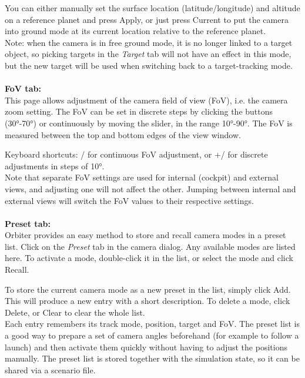 \documentclass[Orbiter User Manual.tex]{subfiles}
\begin{document}
\noindent
You can either manually set the surface location (latitude/longitude) and altitude on a reference planet and press Apply, or just press Current to put the camera into ground mode at its current location relative to the reference planet.\\
Note: when the camera is in free ground mode, it is no longer linked to a target object, so picking targets in the \textit{Target} tab will not have an effect in this mode, but the new target will be used when switching back to a target-tracking mode.\\
\\
\textbf{FoV tab:}\\
This page allows adjustment of the camera field of view (FoV), i.e. the camera zoom setting. The FoV can be set in discrete steps by clicking the buttons (30°-70°) or continuously by moving the slider, in the range 10°-90°. The FoV is measured between the top and bottom edges of the view window.

\begin{figure}[H]
	\centering
\end{figure}

\noindent
Keyboard shortcuts: / for continuous FoV adjustment, or \Ctrl+/ for discrete adjustments in steps of 10°.\\
Note that separate FoV settings are used for internal (cockpit) and external views, and adjusting one will not affect the other. Jumping between internal and external views will switch the FoV values to their respective settings.\\
\\
\textbf{Preset tab:}\\
Orbiter provides an easy method to store and recall camera modes in a preset list. Click on the \textit{Preset} tab in the camera dialog. Any available modes are listed here. To activate a mode, double-click it in the list, or select the mode and click Recall.

\begin{figure}[H]
	\centering
\end{figure}

\noindent
To store the current camera mode as a new preset in the list, simply click Add. This will produce a new entry with a short description. To delete a mode, click Delete, or Clear to clear the whole list.\\
Each entry remembers its track mode, position, target and FoV. The preset list is a good way to prepare a set of camera angles beforehand (for example to follow a launch) and then activate them quickly without having to adjust the positions manually. The preset list is stored together with the simulation state, so it can be shared via a scenario file.
\end{document}
